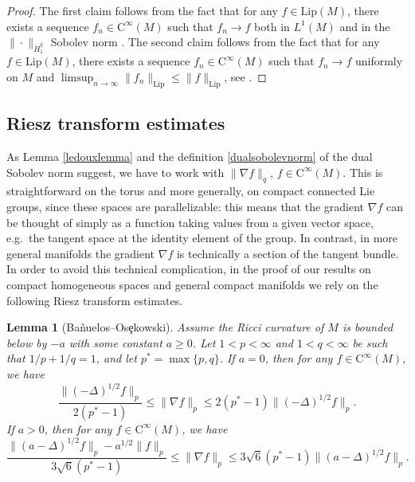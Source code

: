 \documentclass[11pt,a4paper]{article}
\newtheorem{lem}[thm]{Lemma}
\theoremstyle{definition}
\begin{document}
\begin{proof} The first claim follows from the fact that for any $f \in \mathrm{Lip}(M)$, there exists a sequence $f_n \in \mathrm{C}^{\infty}(M)$ such that $f_n \to f$ both in $L^1 (M)$ and in the $\| \cdot \|_{\dot{H}_1^q}$ Sobolev norm \cite[p.\ 11]{HE}. The second claim follows from the fact that for any $f \in \mathrm{Lip}(M)$, there exists a sequence $f_n \in \mathrm{C}^{\infty}(M)$ such that $f_n \to f$ uniformly on $M$ and $\limsup_{n \to \infty} \| f_n \|_{\mathrm{Lip}} \le \| f \|_{\mathrm{Lip}}$, see \cite[Proposition 2.1]{GW}.
\end{proof}

\subsection{Riesz transform estimates}

As Lemma \ref{ledouxlemma} and the definition \eqref{dualsobolevnorm} of the dual Sobolev norm suggest, we have to work with $\| \nabla f \|_q$, $f \in \mathrm{C}^{\infty}(M)$. This is straightforward on the torus and more generally, on compact connected Lie groups, since these spaces are parallelizable: this means that the gradient $\nabla f$ can be thought of simply as a function taking values from a given vector space, e.g.\ the tangent space at the identity element of the group. In contrast, in more general manifolds the gradient $\nabla f$ is technically a section of the tangent bundle. In order to avoid this technical complication, in the proof of our results on compact homogeneous spaces and general compact manifolds we rely on the following Riesz transform estimates. 
\begin{lem}[Ba\~{n}uelos--Os\c{e}kowski] Assume the Ricci curvature of $M$ is bounded below by $-a$ with some constant $a \ge 0$. Let $1<p<\infty$ and $1<q<\infty$ be such that $1/p+1/q=1$, and let $p^*=\max \{ p, q \}$. If $a=0$, then for any $f \in \mathrm{C}^{\infty}(M)$, we have
\begin{equation}\label{riesztransform1}
\frac{\| (-\Delta)^{1/2} f \|_p}{2(p^*-1)} \le \| \nabla f \|_p \le 2(p^*-1) \| (-\Delta)^{1/2} f \|_p .
\end{equation}
If $a>0$, then for any $f \in \mathrm{C}^{\infty}(M)$, we have
\begin{equation}\label{riesztransform2}
\frac{\| (a-\Delta)^{1/2} f \|_p - a^{1/2} \| f \|_p}{3 \sqrt{6}(p^*-1)} \le \| \nabla f \|_p \le 3 \sqrt{6} (p^*-1) \| (a-\Delta)^{1/2} f \|_p .
\end{equation}
\end{lem}
\end{document}
